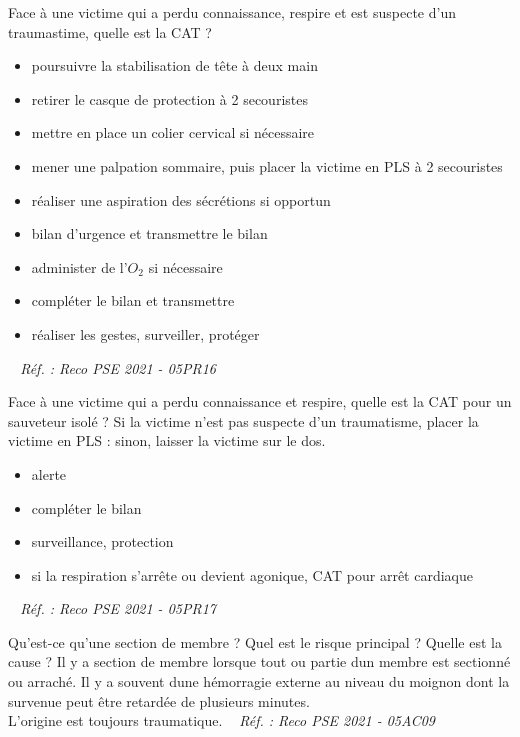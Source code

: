 \documentclass[grid,avery5371,landscape]{flashcards}
\makeatletter
\newcounter{nocarte}
\newcommand{\categ}[1]{%
  \def\@categ{#1}%
  \setcounter{nocarte}{0}%
}
\newcommand{\source}[1]{%
  \medskip
  \itshape%
   ~ \hfill Réf. : #1}
\makeatother
\begin{document}
\color[HTML]{003273}
\categ{PSE}
\begin{flashcard}[CAT]{
 Face à une victime qui a perdu connaissance, respire et est suspecte d'un traumastime, quelle est la CAT ?   }
  \begin{itemize} 
\item poursuivre la stabilisation de tête à deux main
\item retirer le casque de protection à 2 secouristes
\item mettre en place un colier cervical si nécessaire
\item mener une palpation sommaire, puis placer la victime en PLS à 2 secouristes 
 \item réaliser une aspiration des sécrétions si opportun 
\item bilan d'urgence et transmettre le bilan
\item administer de l'$O_2$ si nécessaire 
\item compléter le bilan et transmettre
 \item réaliser les gestes, surveiller, protéger
 \end{itemize}
  \source{Reco PSE 2021 - 05PR16}
\end{flashcard}


\color[HTML]{003273}
\categ{PSE}
\begin{flashcard}[CAT]{
 Face à une victime qui a perdu connaissance et respire, quelle est la CAT pour un sauveteur isolé ?   }
  Si la victime n'est pas suspecte d'un traumatisme, placer la victime en PLS : sinon, laisser la victime sur le dos. 
\begin{itemize} \item alerte \item compléter le bilan \item surveillance, protection \item si la respiration s'arrête ou devient agonique, CAT pour arrêt cardiaque \end{itemize}
  \source{Reco PSE 2021 - 05PR17}
\end{flashcard}


\color[HTML]{003273}
\categ{PSE}
\begin{flashcard}[bilan]{
 Qu'est-ce qu'une section de membre ? Quel est le risque principal ? Quelle est la cause ?   }
  Il y a section de membre lorsque tout ou partie dun membre est sectionné ou arraché. Il y a souvent dune hémorragie externe au niveau du moignon dont la survenue peut être retardée de plusieurs minutes. \\ L'origine est toujours traumatique.
  \source{Reco PSE 2021 - 05AC09}
\end{flashcard}
\end{document}
